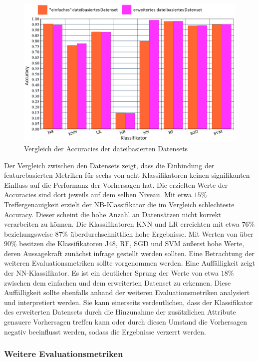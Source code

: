 \begin{figure}[ht]
    \centering
    \includegraphics[width=\textwidth]{images/final_eval}
    \caption{Vergleich der Accuracies der dateibasierten Datensets\label{fig:final-eval}}
\end{figure}

Der Vergleich zwischen den Datensets zeigt, dass die Einbindung der featurebasierten Metriken für sechs von acht Klassifikatoren keinen signifikanten Einfluss auf die Performanz der Vorhersagen hat. Die erzielten Werte der Accuracies sind dort jeweils auf dem selben Niveau. Mit etwa $15\%$ Treffergenauigkeit erzielt der NB-Klassifikator die im Vergleich schlechteste Accuracy. Dieser scheint die hohe Anzahl an Datensätzen nicht korrekt verarbeiten zu können. Die Klassifikatoren KNN und LR erreichten mit etwa $76\%$ beziehungsweise $87\%$ überdurchschnittlich hohe Ergebnisse. Mit Werten von über $90\%$ besitzen die Klassifikatoren J48, RF, SGD und SVM äußerst hohe Werte, deren Aussagekraft zunächst infrage gestellt werden sollten. Eine Betrachtung der weiteren Evaluationsmetriken sollte vorgenommen werden.
Eine Auffälligkeit zeigt der NN-Klassifikator. Es ist ein deutlicher Sprung der Werte von etwa $18\%$ zwischen dem \glqq einfachen\grqq{} und dem erweiterten Datenset zu erkennen. Diese Auffälligkeit sollte ebenfalls anhand der weiteren Evaluationsmetriken analysiert und interpretiert werden. Sie kann einerseits verdeutlichen, dass der Klassifikator des erweiterten Datensets durch die Hinzunahme der zusätzlichen Attribute genauere Vorhersagen treffen kann oder durch diesen Umstand die Vorhersagen negativ beeinflusst werden, sodass die Ergebnisse verzerrt werden.

\subsubsection*{Weitere Evaluationsmetriken}

